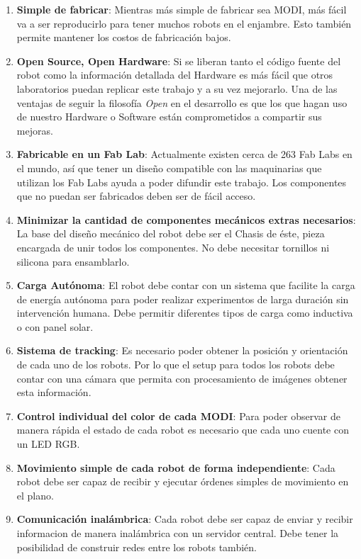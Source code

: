 \begin{enumerate}
\item \textbf{Simple de fabricar}: Mientras más simple de fabricar sea MODI, más fácil va a ser reproducirlo para tener muchos robots en el enjambre. Esto también permite mantener los costos de fabricación bajos. 
\item \textbf{Open Source, Open Hardware}: Si se liberan tanto el código fuente del robot como la información detallada del Hardware es más fácil que otros laboratorios puedan replicar este trabajo y a su vez mejorarlo. Una de las ventajas de seguir la filosofía \textit{Open} en el desarrollo es que los que hagan uso de nuestro Hardware o Software están comprometidos a compartir sus mejoras.
\item \textbf{Fabricable en un Fab Lab}: Actualmente existen cerca de 263 Fab Labs en el mundo, así que tener un diseño compatible con las maquinarias que utilizan los Fab Labs ayuda a poder difundir este trabajo. Los componentes que no puedan ser fabricados deben ser de fácil acceso.
\item \textbf{Minimizar la cantidad de componentes mecánicos extras necesarios}: La base del diseño mecánico del robot debe ser el Chasis de éste, pieza encargada de unir todos los componentes. No debe necesitar tornillos ni silicona para ensamblarlo.
\item \textbf{Carga Autónoma}: El robot debe contar con un sistema que facilite la carga de energía autónoma para poder realizar experimentos de larga duración sin intervención humana. Debe permitir diferentes tipos de carga como inductiva o con panel solar.
\item \textbf{Sistema de tracking}: Es necesario poder obtener la posición y orientación de cada uno de los robots. Por lo que el setup para todos los robots debe contar con una cámara que permita con procesamiento de imágenes obtener esta información.
\item \textbf{Control individual del color de cada MODI}: Para poder observar de manera rápida el estado de cada robot es necesario que cada uno cuente con un LED RGB.
\item \textbf{Movimiento simple de cada robot de forma independiente}: Cada robot debe ser capaz de recibir y ejecutar órdenes simples de movimiento en el plano.
\item \textbf{Comunicación inalámbrica}: Cada robot debe ser capaz de enviar y recibir informacion de manera inalámbrica con un servidor central. Debe tener la posibilidad de construir redes entre los robots también.
\end{enumerate}


